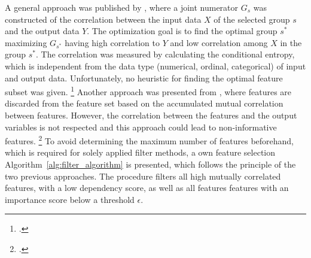 A general approach was published by \cite{hall_feature_1997},
where a joint numerator $G_s$ was constructed of the correlation between the input data $X$ of the selected group $s$ and the output data $Y$.
The optimization goal is to find the optimal group $s^*$ maximizing $G_{s^*}$ having high correlation to $Y$ and low
correlation among $X$ in the group $s^*$. The correlation was measured by calculating the conditional entropy, which is independent
from the data type (numerical, ordinal, categorical) of input and output data. Unfortunately, no heuristic for finding the optimal
feature subset was given. \footcite[cf.][p. 856]{hall_feature_1997} Another approach was presented from \cite{haindl_feature_2006},
where features are discarded from the feature set based on the accumulated mutual correlation between features. However, the correlation between
the features and the output variables is not respected and this approach could lead to non-informative features. \footcite[cf.][]{haindl_feature_2006}
To avoid determining the maximum number of features beforehand, which is required for solely applied filter methods,
a own feature selection Algorithm~\ref{alg:filter_algorithm} is presented, which follows the principle of the two previous approaches.
The procedure filters all  high mutually correlated features, with a low dependency score, as well as all features features with an
importance score below a threshold $\epsilon$.



